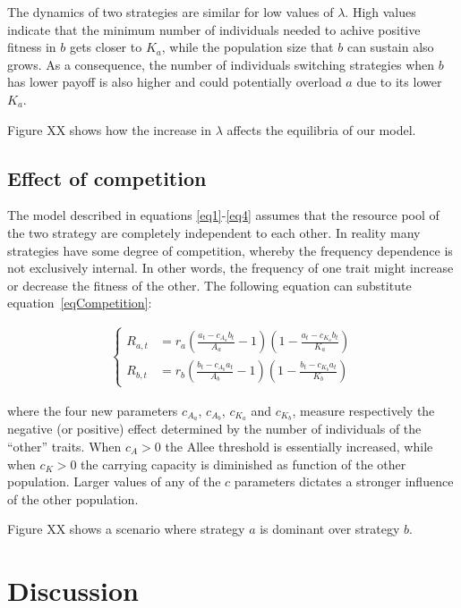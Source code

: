 \documentclass[3p,authoryear,twocolumn]{elsarticle} %
\begin{document}
The dynamics of two strategies are similar for low values of $\lambda$. High values indicate that the minimum number of individuals needed to achive positive fitness in $b$ gets closer to $K_a$, while the population size that $b$ can sustain also grows. As a consequence, the number of individuals switching strategies when $b$ has lower payoff is also higher and could potentially overload $a$ due to its lower $K_a$.

Figure XX shows how the increase in $\lambda$ affects the equilibria of our model.


\subsection{Effect of competition}

The model described in equations \ref{eq1}-\ref{eq4} assumes that the resource pool of the two strategy are completely independent to each other. In reality many strategies have some degree of competition, whereby the frequency dependence is not exclusively internal. In other words, the frequency of one trait might increase or decrease the fitness of the other. The following equation can substitute equation~\eqref{eqCompetition}: 

\begin{align}
\begin{cases}
R_{a,t}& = r_a (\frac{a_t-c_{A_a}b_t}{A_a}-1)(1-\frac{a_t-c_{K_a}b_t}{K_a})\\
R_{b,t}& = r_b (\frac{b_t-c_{A_b}a_t}{A_b}-1)(1-\frac{b_t-c_{K_b}a_t}{K_b}) 
\end{cases}
\label{eqCompetition}
\end{align}

where the four new parameters $c_{A_a}$, $c_{A_b}$, $c_{K_a}$ and $c_{K_b}$, measure respectively the negative (or positive) effect determined by the number of individuals of the “other” traits. When $c_{A}>0$ the Allee threshold is essentially increased, while when $c_{K}>0$ the carrying capacity is diminished as function of the other population. Larger values of any of the $c$ parameters dictates a stronger influence of the other population. 

Figure XX shows a scenario where strategy $a$ is dominant over strategy $b$.

\section{Discussion}
\end{document}
